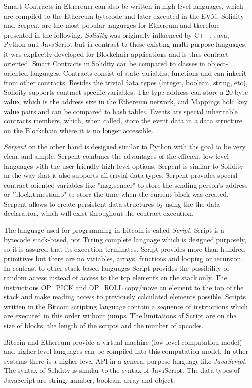 \documentclass[conference]{IEEEtran}
\begin{document}
Smart Contracts in Ethereum can also be written in high level languages, which are compiled to the Ethereum bytecode and later executed in the EVM. Solidity and Serpent are the most popular languages for Ethereum and therefore presented in the following. \textit{Solidity} was originally influenced by C++, Java, Python and JavaScript but in contrast to these existing multi-purpose languages, it was explicetly developed for Blockchain applications and is thus contract-oriented. Smart Contracts in Solidity can be compared to classes in object-oriented languages. Contracts consist of state variables, functions and can inherit from other contracts. Besides the trivial data types (integer, boolean, string, etc), Solidity supports contract specific variables. The type address can store a 20 byte value, which is the address size in the Ethereum network, and Mappings hold key value pairs and can be compared to hash tables. Events are special inheritable contracts members, which, when called, store the event data in a data structure on the Blockchain where it is no longer accessible. \cite{Solidity2017} \cite{McAdams2017} \par 
\textit{Serpent} on the other hand is designed similar to Python with the goal to be very clean and simple. Serpent combines the advantages of the efficient low level languages with the user-friendly high level options. Serpent is similar to Solidity in the way that it also supports all trivial data types. Serpent provides special contract-oriented variables like "msg.sender" to store the sending person's address or "block.timestamp" to store the time when the current block was created. Serpent allows to create persistent data structures by using the the data declaration, which will exist throughout the contract execution. \cite{McAdams2017} \cite{Arnett2015} \par 
The language used for programming in Bitcoin is called \textit{Script}. Script is a bytecode stack-based, not Turing complete language which is designed purposely, so it is assured that its execution terminates. Script provides more than hundred primitives but there are no variables, arrays, functions and looping or recursion. In contrast to other stack-based languages Script provides the possibility of random access instead of access to the top elements on the stack only. The instructions OP\_PICK and OP\_ROLL copy/move an element to the top of the stack and make reading access to previously calculated elements possible. Scripts written in the Bitcoin scripting language contain a sequence of instructions which are executed in this order without jumps. The limitations of Script are on the size of blocks, the length of the scripts and the number of opcodes. \cite{McAdams2017} \par 
Bitcoin and Ethereum provide a virtual machine (low level computation model) and higher level languages can be compiled into this computation model. In other systems there is a higher-level API in a general purpose language like \textit{JavaScript}. The syntax of Solidity is similar to the syntax of JavaScript. \cite{McAdams2017} The data types of JavaScript are string, number, boolean, array and object. \cite{McPeak2015} \par 
\end{document}
